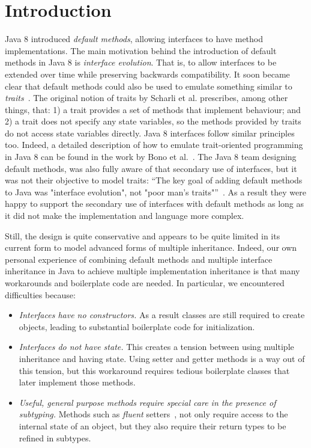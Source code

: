 \section{Introduction}\label{sec:intro}

Java 8 introduced \emph{default methods}, allowing interfaces to have
method implementations. The main motivation behind the introduction of
default methods in Java 8 is \emph{interface evolution}. That is, to
allow interfaces to be extended over time while preserving backwards
compatibility. It soon became clear that default methods could also be
used to emulate something similar to \emph{traits}~\cite{scharli03traits}. The
original notion of traits by Scharli et al. prescribes, among other
things, that: 1) a trait provides a set of methods that implement
behaviour; and 2) a trait does not specify any state variables, so the
methods provided by traits do not access state variables
directly. Java 8 interfaces follow similar principles too. Indeed, a
detailed description of how to emulate trait-oriented programming in
Java 8 can be found in the work by Bono et al.~\cite{bono14}. The Java 8
team designing default methods, was also fully aware of that secondary
use of interfaces, but it was not their objective to model traits:
``The key goal of adding default methods to Java was "interface
evolution", not "poor man's traits"''~\cite{goetz13default}. As a result
they were happy to support the secondary use of interfaces with
default methods as long as it did not make the implementation and
language more complex.
 
Still, the design is quite conservative and appears to be quite limited
 in its current form to model advanced forms of multiple inheritance.
Indeed, our own personal experience of combining default methods 
and multiple interface inheritance in Java to achieve multiple implementation 
inheritance is that many workarounds and boilerplate code are needed. 
In particular, we encountered difficulties because:

\begin{itemize}

\item {\em Interfaces have no constructors.} As a result classes are 
still required to create objects, leading to substantial boilerplate 
code for initialization.

\item {\em Interfaces do not have state.} This creates a tension between 
 using multiple inheritance and having state. Using setter and
  getter methods is a way out of this tension, but this workaround
  requires tedious boilerplate classes that later implement those
  methods.

\item {\em Useful, general purpose methods require special care in
  the presence of subtyping.} Methods such as
  \emph{fluent} setters~\cite{fowler2005fluentinterface}, not only require access to the
  internal state of an object, but they also require their return types to be
  refined in subtypes.

\end{itemize}


